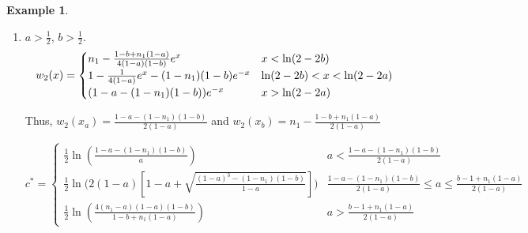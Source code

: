 \documentclass[11pt]{article}
\theoremstyle{definition}
\newtheorem{ex}[thm]{Example}
\numberwithin{equation}{section}
\numberwithin{thm}{section}
\renewcommand{\a}{a}
\renewcommand{\b}{b}
\newcommand{\m}{n_1}
\begin{document}
\begin{ex}
\begin{enumerate}[{Case} 1.]
\item $\a>\frac{1}{2}$, $\b>\frac{1}{2}$.
\begin{equation}
w_2(x) = \begin{cases}
\m \Conecasethree e^x  & x < \ln(2-2\b) \\
1 - \Ctwocasetwo e^x - \Cthreecasetwo e^{-x} & \ln(2-2\b) < x < \ln(2-2\a) \\
(\Cfourcasethree) e^{-x} & x > \ln(2-2\a)
\end{cases}
\end{equation}

Thus, $w_2(x_\a)=\frac{1-\a-(1-\m)(1-\b)}{2(1-\a)}$ and $w_2(x_\b)=\m - \frac{1-\b+\m(1-\a)}{2(1-\a)}$

\begin{equation}
c^* = \begin{cases}
\frac{1}{2} \ln \left( \frac{1-\a-(1-\m)(1-\b)}{\a} \right) & \a<\frac{1-\a-(1-\m)(1-\b)}{2(1-\a)} \\
\frac{1}{2} \ln \Big( 2(1-\a)\left[1-\a + \sqrt{\frac{(1-\a)^3-(1-\m)(1-\b) }{1-\a}}\right] \Big) & \frac{1-\a-(1-\m)(1-\b)}{2(1-\a)}\leq\a\leq\frac{\b-1+\m(1-\a)}{2(1-\a)} \\
\frac{1}{2} \ln \left( \frac{4(\m-\a)(1-\a)(1-\b)}{1-\b+\m(1-\a)}\right) & \a>\frac{\b-1+\m(1-\a)}{2(1-\a)}
\end{cases}
\end{equation}

\end{enumerate}


\end{ex}
\end{document}
